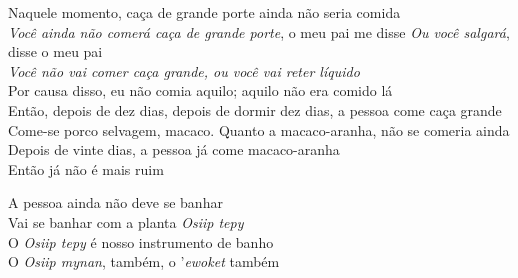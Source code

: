\begin{linenumbers}\begingroup\raggedright
 
\noindent Naquele momento, caça de grande porte ainda não seria comida\\
 \emph{Você ainda não comerá caça de grande porte}, o meu pai me disse \emph{Ou você salgará}, disse o meu pai\\
 \emph{Você não vai comer caça grande, ou você vai reter líquido}\\
 Por causa disso, eu não comia aquilo; aquilo não era comido lá\\
 Então, depois de dez dias, depois de dormir dez dias, a pessoa come caça grande\\
 Come-se porco selvagem, macaco. Quanto a macaco-aranha, não se comeria ainda\\
 Depois de vinte dias, a pessoa já come macaco-aranha\\
 Então já não é mais ruim
 
\end{linenumbers}\endgroup

\bigskip

\begin{linenumbers}\begingroup\raggedright
 
\noindent A pessoa ainda não deve se banhar\\
 Vai se banhar com a planta \emph{Osiip tepy}\\
 O \emph{Osiip tepy} é nosso instrumento de banho\\
 O \emph{Osiip mynan}, também, o '\emph{ewoket} também
 
\end{linenumbers}\endgroup

